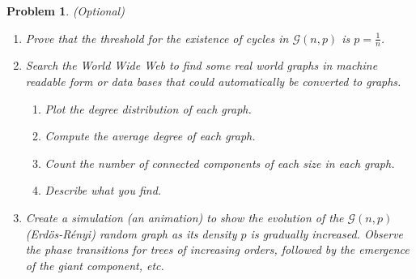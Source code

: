 \documentclass[12pt]{article}
\newtheorem{hw}{Problem}
\begin{document}
\begin{hw}(Optional)

\begin{enumerate}

\item Prove that the threshold for the existence of cycles in $\mathcal{G}(n,p)$ is $p=\frac{1}{n}$.
\item Search the \emph{World Wide Web} to find some real world graphs in machine readable form or data bases that could automatically be converted to graphs.

\begin{enumerate}
  \item Plot the degree distribution of each graph.
  \item Compute the average degree of each graph.
  \item Count the number of connected components of each size in each graph.
  \item Describe what you find.
\end{enumerate}
\item Create a simulation (an animation) to  show the evolution of the $\mathcal{G}(n,p)$ (Erd\"{o}s-R\'{e}nyi) random graph as its density $p$ is gradually increased. Observe the phase transitions for trees of increasing orders, followed by the emergence of the giant component, etc.
\end{enumerate}
\end{hw}
\end{document}
